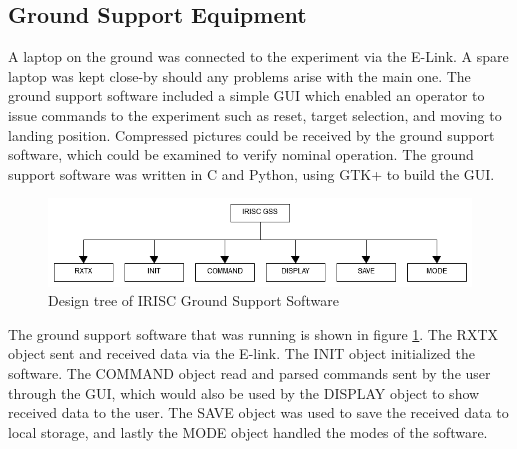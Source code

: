 \pagebreak
\subsection{Ground Support Equipment}\label{sec:4.9}
A laptop on the ground was connected to the experiment via the E-Link. A spare laptop was kept close-by should any problems arise with the main one. The ground support software included a simple GUI which enabled an operator to issue commands to the experiment such as reset, target selection, and moving to landing position. Compressed pictures could be received by the ground support software, which could be examined to verify nominal operation. The ground support software was written in C and Python, using GTK+ to build the GUI.

\begin{figure}[h]
	\centering
	\includegraphics[width=\textwidth]{4-experiment-design/img/software/GSS-tree.png}
	\caption{Design tree of IRISC Ground Support Software}
	\label{fig:gss-tree}
\end{figure}

The ground support software that was running is shown in figure \ref{fig:gss-tree}. The RXTX object sent and received data via the E-link. The INIT object initialized the software. The COMMAND object read and parsed commands sent by the user through the GUI, which would also be used by the DISPLAY object to show received data to the user. The SAVE object was used to save the received data to local storage, and lastly the MODE object handled the modes of the software.
\raggedbottom
